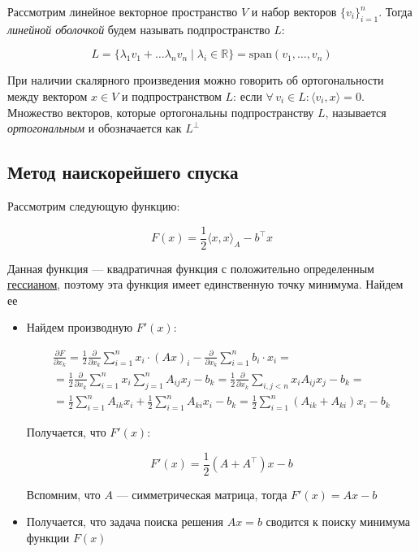 \begin{definition}
    Рассмотрим линейное векторное пространство $V$ и набор векторов $\{v_i\}_{i = 1}^n$. Тогда \textit{линейной оболочкой} будем называть подпространство $L$:

    \[
    L = \{\lambda_1 v_1 + \ldots \lambda_n v_n \mid \lambda_i \in \mathbb{R} \} = \mathrm{span}(v_1, \ldots, v_n)
    \]
\end{definition}


\begin{definition}
    При наличии скалярного произведения можно говорить об ортогональности между вектором $x \in V$ и подпространством $L$: если $\forall \, v_i \in L: \langle v_i, x \rangle = 0$. Множество векторов, которые ортогональны подпространству $L$, называется \textit{ортогональным} и обозначается как $L^{\perp}$
\end{definition}

\subsection{Метод наискорейшего спуска}

Рассмотрим следующую функцию:

\[
F(x) = \frac{1}{2} \langle x, x \rangle_A - b^{\top} x
\]

Данная функция --- квадратичная функция с положительно определенным \href{https://en.wikipedia.org/wiki/Hessian_matrix}{гессианом}, поэтому эта функция имеет единственную точку минимума. Найдем ее

\begin{itemize}
    \item Найдем производную $F'(x)$:

    \begin{multline*}
    \frac{\partial F}{\partial x_k} = \frac{1}{2}\frac{\partial}{\partial x_k} \sum\limits_{i=1}^n x_i \cdot (Ax)_i - \frac{\partial}{\partial x_k} \sum\limits_{i=1}^n b_i \cdot x_i = \\
    = \frac{1}{2}\frac{\partial}{\partial x_k} \sum\limits_{i=1}^n x_i \sum\limits_{j = 1}^n A_{ij} x_j - b_k = \frac{1}{2}\frac{\partial}{\partial x_k} \sum\limits_{i, j < n} x_i A_{ij} x_j - b_k = \\
    = \frac{1}{2}\sum\limits_{i = 1}^n A_{ik} x_i + \frac{1}{2}\sum\limits_{i = 1}^n A_{ki} x_i - b_k = \frac{1}{2}\sum\limits_{i = 1}^n (A_{ik} + A_{ki}) x_i - b_k
    \end{multline*}

    Получается, что $F'(x)$:

    \[
    F'(x) = \frac{1}{2} (A + A^{\top})x - b
    \]

    Вспомним, что $A$ --- симметрическая матрица, тогда $F'(x) = Ax - b$

    \item Получается, что задача поиска решения $Ax = b$ сводится к поиску минимума функции $F(x)$
\end{itemize}

